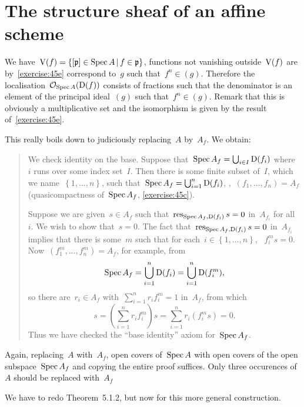 \section{The structure sheaf of an affine scheme}

\begin{exercise}
  We have~$\operatorname{V}(f)=\left\{ [\mathfrak{p}]\in\operatorname{Spec} A\,|\,f\in\mathfrak{p} \right\}$, functions not vanishing outside~$\operatorname{V}(f)$ are by~\autoref{exercise:45e} correspond to~$g$ such that~$f^n\in(g)$. Therefore the localisation~$\mathcal{O}_{\operatorname{Spec} A}(\operatorname{D}(f))$ consists of fractions such that the denominator is an element of the principal ideal~$(g)$ such that~$f^n\in(g)$. Remark that this is obviously a multiplicative set and the isomorphism is given by the result of~\autoref{exercise:45e}.
\end{exercise}

\begin{exercise}
  This really boils down to judiciously replacing~$A$ by~$A_f$. We obtain:
  \begin{quote}
    We check identity on the base. Suppose that~$\operatorname{Spec} A_f=\bigcup_{i\in I}\operatorname{D}(f_i)$ where~$i$ runs over some index set~$I$. Then there is some finite subset of~$I$, which we name~$\left\{ 1,\ldots,n \right\}$, such that~$\operatorname{Spec} A_f=\bigcup_{i=1}^n\operatorname{D}(f_i)$, \ie,~$(f_1,\ldots,f_n)=A_f$ (quasicompactness of~$\operatorname{Spec} A_f$, \autoref{exercise:45c}).

    Suppose we are given~$s\in A_f$ such that~$\operatorname{res}_{\operatorname{Spec} A_f,\operatorname{D}(f_i)}s=0$ in~$A_{f_i}$ for all~$i$. We wish to show that~$s=0$. The fact that~$\operatorname{res}_{\operatorname{Spec} A_f,\operatorname{D}(f_i)}s=0$ in~$A_{f_i}$ implies that there is some~$m$ such that for each~$i\in\left\{ 1,\ldots,n \right\}$, ~$f_i^ms=0$. Now~$(f_1^m,\ldots,f_n^m)=A_f$, for example, from
    \begin{equation}
      \operatorname{Spec} A_f=\bigcup_{i=1}^n\operatorname{D}(f_i)=\bigcup_{i=1}^n\operatorname{D}(f_i^m),
    \end{equation}
    so there are~$r_i\in A_f$ with~$\sum_{i=1}^nr_if_i^m=1$ in~$A_f$, from which
    \begin{equation}
      s=\left( \sum_{i=1}^nr_if_i^m \right)s=\sum_{i=1}^nr_i(f_i^ms)=0.
    \end{equation}
    Thus we have checked the ``base identity'' axiom for~$\operatorname{Spec} A_f$.
  \end{quote}
\end{exercise}

\begin{exercise}
  \label{exercise:51c}
  Again, replacing~$A$ with~$A_f$, open covers of~$\operatorname{Spec} A$ with open covers of the open subspace~$\operatorname{Spec} A_f$ and copying the entire proof suffices. Only three occurences of~$A$ should be replaced with~$A_f$
\end{exercise}

\begin{exercise}
  \label{exercise:51d}
  We have to redo Theorem~5.1.2, but now for this more general construction.
\end{exercise}

